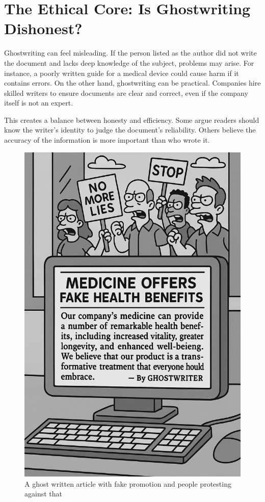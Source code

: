 \documentclass[a4paper,10pt,twocolumn]{memoir}
\begin{document}
\section*{The Ethical Core: Is Ghostwriting Dishonest?}
Ghostwriting can feel misleading. If the person listed as the author did not write the document and lacks deep knowledge of the subject, problems may arise. For instance, a poorly written guide for a medical device could cause harm if it contains errors. On the other hand, ghostwriting can be practical. Companies hire skilled writers to ensure documents are clear and correct, even if the company itself is not an expert.

This creates a balance between honesty and efficiency. Some argue readers should know the writer’s identity to judge the document’s reliability. Others believe the accuracy of the information is more important than who wrote it.

\begin{figure}[ht]
  \centering
  \includegraphics[width=\columnwidth]{gw2.png}
  \caption*{A ghost written article with fake promotion and people protesting against that}
  \label{gw2}
\end{figure}
\end{document}
